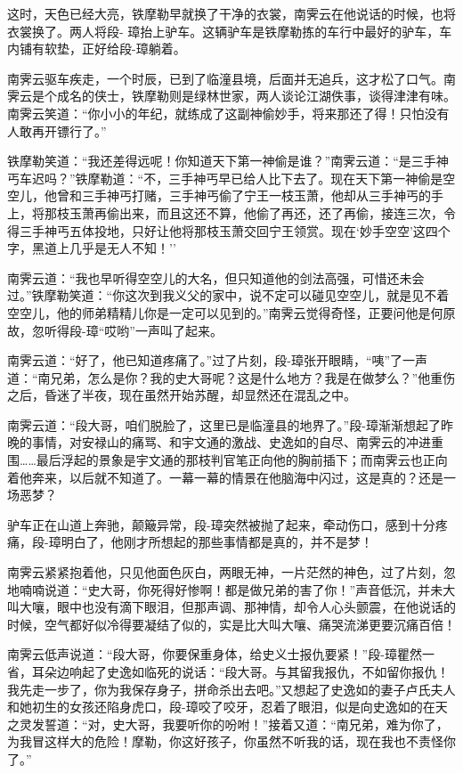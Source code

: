\documentclass[12pt,oneside]{book}
\begin{document}
这时，天色已经大亮，铁摩勒早就换了干净的衣裳，南霁云在他说话的时候，也将衣裳换了。两人将段-
璋抬上驴车。这辆驴车是铁摩勒拣的车行中最好的驴车，车内铺有软垫，正好给段-璋躺着。

南霁云驱车疾走，一个时辰，已到了临潼县境，后面并无追兵，这才松了口气。南霁云是个成名的侠士，铁摩勒则是绿林世家，两人谈论江湖佚事，谈得津津有味。南霁云笑道：``你小小的年纪，就练成了这副神偷妙手，将来那还了得！只怕没有人敢再开镖行了。''

铁摩勒笑道：``我还差得远呢！你知道天下第一神偷是谁？''南霁云道：``是三手神丐车迟吗？''铁摩勒道：``不，三手神丐早已给人比下去了。现在天下第一神偷是空空儿，他曾和三手神丐打赌，三手神丐偷了宁王一枝玉萧，他却从三手神丐的手上，将那枝玉萧再偷出来，而且这还不算，他偷了再还，还了再偷，接连三次，令得三手神丐五体投地，只好让他将那枝玉萧交回宁王领赏。现在`妙手空空'这四个字，黑道上几乎是无人不知！''

南霁云道：``我也早听得空空儿的大名，但只知道他的剑法高强，可惜还未会过。''铁摩勒笑道：``你这次到我义父的家中，说不定可以碰见空空儿，就是见不着空空儿，他的师弟精精儿你是一定可以见到的。''南霁云觉得奇怪，正要问他是何原故，忽听得段-璋``哎哟''一声叫了起来。

南霁云道：``好了，他已知道疼痛了。''过了片刻，段-璋张开眼睛，``咦''了一声道：``南兄弟，怎么是你？我的史大哥呢？这是什么地方？我是在做梦么？''他重伤之后，昏迷了半夜，现在虽然开始苏醒，却显然还在混乱之中。

南霁云道：``段大哥，咱们脱脸了，这里已是临潼县的地界了。''段-璋渐渐想起了昨晚的事情，对安禄山的痛骂、和宇文通的激战、史逸如的自尽、南霁云的冲进重围\ldots\ldots 最后浮起的景象是宇文通的那枝判官笔正向他的胸前插下；而南霁云也正向着他奔来，以后就不知道了。一幕一幕的情景在他脑海中闪过，这是真的？还是一场恶梦？

驴车正在山道上奔驰，颠簸异常，段-璋突然被抛了起来，牵动伤口，感到十分疼痛，段-璋明白了，他刚才所想起的那些事情都是真的，并不是梦！

南霁云紧紧抱着他，只见他面色灰白，两眼无神，一片茫然的神色，过了片刻，忽地喃喃说道：``史大哥，你死得好惨啊！都是做兄弟的害了你！''声音低沉，并未大叫大嚷，眼中也没有滴下眼泪，但那声调、那神情，却令人心头颤震，在他说话的时候，空气都好似冷得要凝结了似的，实是比大叫大嚷、痛哭流涕更要沉痛百倍！

南霁云低声说道：``段大哥，你要保重身体，给史义士报仇要紧！''段-璋瞿然一省，耳朵边响起了史逸如临死的说话：``段大哥。与其留我报仇，不如留你报仇！我先走一步了，你为我保存身子，拼命杀出去吧。''又想起了史逸如的妻子卢氏夫人和她初生的女孩还陷身虎口，段-璋咬了咬牙，忍着了眼泪，似是向史逸如的在天之灵发誓道：``对，史大哥，我要听你的吩咐！''接着又道：``南兄弟，难为你了，为我冒这样大的危险！摩勒，你这好孩子，你虽然不听我的话，现在我也不责怪你了。''
\end{document}
